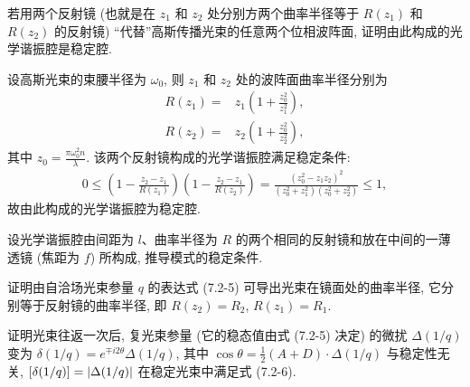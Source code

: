 \documentclass{note}
\begin{document}
\begin{exe}
    若用两个反射镜 (也就是在 $z_1$ 和 $z_2$ 处分别方两个曲率半径等于 $R(z_1)$ 和 $R(z_2)$ 的反射镜) ``代替''高斯传播光束的任意两个位相波阵面, 证明由此构成的光学谐振腔是稳定腔.
\end{exe}
\begin{pf}
    设高斯光束的束腰半径为 $\omega_0$, 则 $z_1$ 和 $z_2$ 处的波阵面曲率半径分别为
    \begin{align}
        R(z_1)=&z_1\left(1+\frac{z_0^2}{z_1^2}\right),\\
        R(z_2)=&z_2\left(1+\frac{z_0^2}{z_2^2}\right),
    \end{align}
    其中 $z_0=\frac{\pi\omega_0^2n}{\lambda}$.
    该两个反射镜构成的光学谐振腔满足稳定条件:
    \begin{align}
        0\leq\left(1-\frac{z_2-z_1}{R(z_1)}\right)\left(1-\frac{z_2-z_1}{R(z_2)}\right)=\frac{(z_0^2-z_1z_2)^2}{(z_0^2+z_1^2)(z_0^2+z_2^2)}\leq 1,
    \end{align}
    故由此构成的光学谐振腔为稳定腔.
\end{pf}

\begin{exe}
    设光学谐振腔由间距为 $l$、曲率半径为 $R$ 的两个相同的反射镜和放在中间的一薄透镜 (焦距为 $f$) 所构成, 推导模式的稳定条件.
\end{exe}
\begin{sol}
    
\end{sol}

\begin{exe}
    证明由自洽场光束参量 $q$ 的表达式 (7.2-5) 可导出光束在镜面处的曲率半径, 它分别等于反射镜的曲率半径, 即 $R(z_2)=R_2$, $R(z_1)=R_1$.
\end{exe}
\begin{pf}
    
\end{pf}

\begin{exe}
    证明光束往返一次后, 复光束参量 (它的稳态值由式 (7.2-5) 决定) 的微扰 $\Delta(1/q)$ 变为 $\delta(1/q)=e^{\mp i2\theta}\Delta(1/q)$, 其中 $\cos\theta=\frac{1}{2}(A+D)\cdot\Delta(1/q)$ 与稳定性无关, $[\delta(1/q)]=\left\lvert\Delta(1/q)\right\rvert$ 在稳定光束中满足式 (7.2-6).
\end{exe}
\begin{pf}
    
\end{pf}
\ifx\allfiles\undefined
\end{document}
